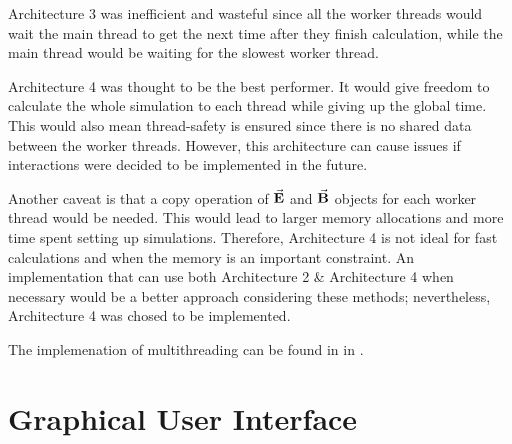 \documentclass[a4paper,oneside,12pt]{report}
\numberwithin{equation}{chapter}
\begin{document}
{Architecture 3 was inefficient and wasteful since all the worker threads would wait the main thread to get the next time after they finish calculation, while the main thread would be waiting for the slowest worker thread.

Architecture 4 was thought to be the best performer. It would give freedom to calculate the whole simulation to each thread while giving up the global time.
This would also mean thread-safety is ensured since there is no shared data between the worker threads. 
However, this architecture can cause issues if \ee interactions were decided to be implemented in the future.

Another caveat is that a copy operation of $\vec{\textbf{E}}$ and $\vec{\textbf{B}}$ objects for each worker thread would be needed.
This would lead to larger memory allocations and more time spent setting up simulations. 
Therefore, Architecture 4 is not ideal for fast calculations and when the memory is an important constraint.
An implementation that can use both Architecture 2 \& Architecture 4 when necessary would be a better approach considering these methods;
nevertheless, Architecture 4 was chosed to be implemented.

The implemenation of multithreading can be found in  in .



\clearpage
\section{Graphical User Interface}

}
\end{document}
